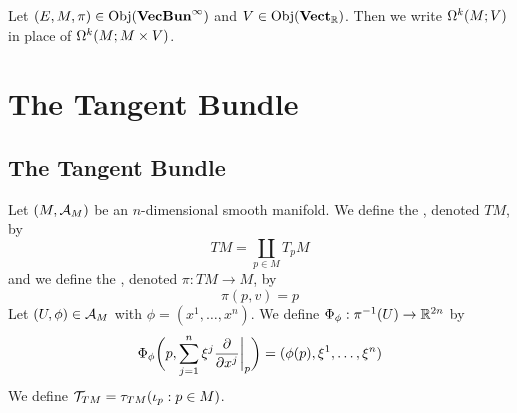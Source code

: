 \documentclass{book}
\begin{document}
	\begin{note}
		Let $(E, M, \pi) \in \operatorname{Obj}(\operatorname*{\text{\textbf{VecBun}}^{\infty}})$ and $V \in \operatorname{Obj}(\operatorname*{\text{\textbf{Vect}}_{\mathbb{R}}})$. Then we write $\Omega^k(M; V)$ in place of $\Omega^k(M; M \times V)$.
	\end{note}

































\newpage
\chapter{The Tangent Bundle}

\section{The Tangent Bundle}

\begin{defn}
	Let $(M, \mathcal{A}_M)$ be an $n$-dimensional smooth manifold. We define the , denoted $TM$, by  
	$$TM = \coprod_{p \in M} T_p M $$ 
	and we define the , denoted $\pi: TM \rightarrow M$, by 
	$$\pi(p, v) = p$$
	Let $(U, \phi) \in \mathcal{A}_M$ with $\phi = (x^1, \ldots, x^n)$. We define $\Phi_{\phi}: \pi^{-1}(U) \rightarrow \mathbb{R}^{2n}$ by 
	$$\Phi_{\phi} \bigg(p, \sum_{j=1}^n \xi^j \frac{\partial}{\partial x^j} \bigg|_p \bigg) = (\phi(p), \xi^1, \ldots, \xi^n)$$ 
	We define $\mathcal{T}_{TM} = \tau_{TM}(\iota_p : p \in M)$.
\end{defn}
\end{document}
